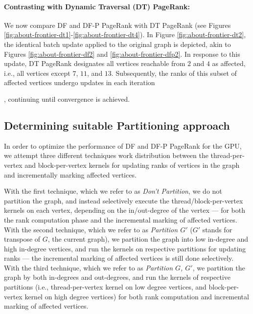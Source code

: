 \paragraph{Contrasting with Dynamic Traversal (DT) PageRank:}

We now compare DF and DF-P PageRank with DT PageRank (see Figures \ref{fig:about-frontier-dt1}-\ref{fig:about-frontier-dt4}). In Figure \ref{fig:about-frontier-dt2}, the identical batch update applied to the original graph is depicted, akin to Figures \ref{fig:about-frontier-df2} and \ref{fig:about-frontier-dfp2}. In response to this update, DT PageRank designates all vertices reachable from $2$ and $4$ as affected, i.e., all vertices except $7$, $11$, and $13$. Subsequently, the ranks of this subset of affected vertices undergo updates in each iteration, continuing until convergence is achieved.





\subsection{Determining suitable Partitioning approach}
\label{sec:parition-determine}

In order to optimize the performance of DF and DF-P PageRank for the GPU, we attempt three different techniques work distribution between the thread-per-vertex and block-per-vertex kernels for updating ranks of vertices in the graph and incrementally marking affected vertices.

With the first technique, which we refer to as \textit{Don't Partition}, we do not partition the graph, and instead selectively execute the thread/block-per-vertex kernels on each vertex, depending on the in/out-degree of the vertex --- for both the rank computation phase and the incremental marking of affected vertices. With the second technique, which we refer to as \textit{Partition $G'$} ($G'$ stands for transpose of $G$, the current graph), we partition the graph into low in-degree and high in-degree vertices, and run the kernels on respective partitions for updating ranks --- the incremental marking of affected vertices is still done selectively. With the third technique, which we refer to as \textit{Partition $G$, $G'$}, we partition the graph by both in-degrees and out-degrees, and run the kernels of respective partitions (i.e., thread-per-vertex kernel on low degree vertices, and block-per-vertex kernel on high degree vertices) for both rank computation and incremental marking of affected vertices.

